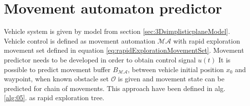 \section{Movement automaton predictor}\label{ch:movementAutomatonPredictor}
\noindent Vehicle system is given by model from section \ref{sec:3DsimplisticplaneModel}. Vehicle control is defined as movement automation $\mathscr{MA}$ with rapid exploration movement set defined in equation \ref{eq:rapidExplorationMovementSet}. Movement predictor needs to be developed in order to obtain control signal $u(t)$ It is possible to predict movement buffer $B_{\mathscr{MA}}$, between vehicle initial position $x_0$ and waypoint, when known obstacle set $\mathscr{O}$ is given and movement state can be predicted for chain of movements. This approach have been defined in alg. \ref{alg:05}. as rapid exploration tree. 

